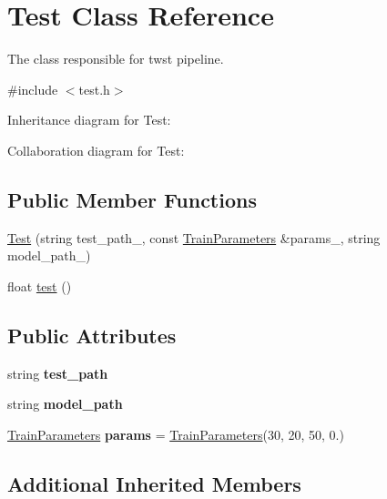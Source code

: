 \hypertarget{class_test}{}\section{Test Class Reference}
\label{class_test}


The class responsible for twst pipeline.  




{\ttfamily \#include $<$test.\+h$>$}



Inheritance diagram for Test\+:


Collaboration diagram for Test\+:
\subsection*{Public Member Functions}
\begin{DoxyCompactItemize}
\item 
\hyperlink{class_test_a6eeaef1054e710158c2d48a6c3497a23}{Test} (string test\+\_\+path\+\_\+, const \hyperlink{struct_train_parameters}{Train\+Parameters} \&params\+\_\+, string model\+\_\+path\+\_\+)
\item 
float \hyperlink{class_test_ae984138ce2da7b201d3fa97a4b775fb3}{test} ()
\end{DoxyCompactItemize}
\subsection*{Public Attributes}
\begin{DoxyCompactItemize}
\item 
\mbox{\label{class_test_a21a60879556addaa11427cb30b9be5fc}} 
string {\bfseries test\+\_\+path}
\item 
\mbox{\label{class_test_a857cf5151c5bd7e29d33569bd7237fde}} 
string {\bfseries model\+\_\+path}
\item 
\mbox{\label{class_test_a25806965ae8a4513ccad5ad31ce8a8df}} 
\hyperlink{struct_train_parameters}{Train\+Parameters} {\bfseries params} = \hyperlink{struct_train_parameters}{Train\+Parameters}(30, 20, 50, 0.)
\end{DoxyCompactItemize}
\subsection*{Additional Inherited Members}


